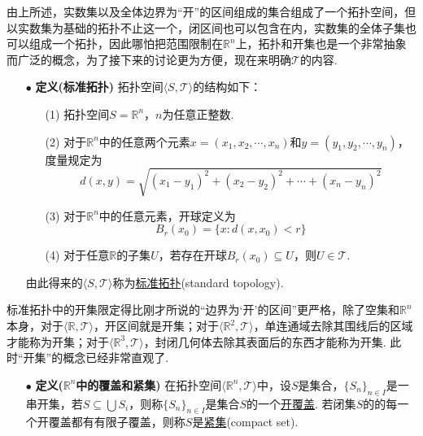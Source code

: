 \documentclass[main.tex]{subfiles}
\begin{document}
由上所述，实数集以及全体边界为“开”的区间组成的集合组成了一个拓扑空间，但以实数集为基础的拓扑不止这一个，闭区间也可以包含在内，实数集的全体子集也可以组成一个拓扑，因此哪怕把范围限制在\(\mathbb{R}^n\)上，拓扑和开集也是一个非常抽象而广泛的概念，为了接下来的讨论更为方便，现在来明确\(\mathcal{T}\)的内容.

\begin{itemize}
    \item [\(\bullet\)] \textbf{定义(标准拓扑)}
    \newline
    拓扑空间\(\langle S, \mathcal{T} \rangle\)的结构如下：
    \begin{itemize}
        \item[(1)] 拓扑空间\(S=\mathbb{R}^n\)，\(n\)为任意正整数.
        \item[(2)] 对于\(\mathbb{R}^n\)中的任意两个元素\(x=(x_1, x_2, \cdots, x_n)\)和\(y=(y_1,y_2,\cdots,y_n)\)，度量规定为
        \[d(x,y)=\sqrt{(x_1-y_1)^2+(x_2-y_2)^2+\cdots+(x_n-y_n)^2}\]
        \item[(3)] 对于\(\mathbb{R}^n\)中的任意元素，开球定义为
        \[B_r(x_0) = \{x: d(x,x_0) < r\}\]
        \item[(4)] 对于任意\(\mathbb{R}\)的子集\(U\)，若存在开球\(B_r(x_0) \subseteq U\)，则\(U \in \mathcal{T}\).
    \end{itemize}
    由此得来的\(\langle S, \mathcal{T} \rangle\)称为\uline{标准拓扑}(standard topology).
\end{itemize}

标准拓扑中的开集限定得比刚才所说的“边界为‘开’的区间”更严格，除了空集和\(\mathbb{R}^n\)本身，对于\(\langle \mathbb{R}, \mathcal{T} \rangle\)，开区间就是开集；对于\(\langle \mathbb{R}^2, \mathcal{T} \rangle\)，单连通域去除其围线后的区域才能称为开集；对于\(\langle \mathbb{R}^3, \mathcal{T} \rangle\)，封闭几何体去除其表面后的东西才能称为开集. 此时“开集”的概念已经非常直观了.

\begin{itemize}
    \item [\(\bullet\)] \textbf{定义(\(\mathbb{R}^n\)中的覆盖和紧集)}
    \newline
    在拓扑空间\(\langle \mathbb{R}^n,\mathcal{T} \rangle \)中，设\(S\)是集合，\(\{S_n\}_{n \in I}\)是一串开集，若\(S \subseteq \bigcup S_i\)，则称\(\{S_n\}_{n \in I}\)是集合\(S\)的一个\uline{开覆盖}.
    \newline
    若闭集\(S\)的的每一个开覆盖都有有限子覆盖，则称\(S\)是\uline{紧集}(compact set).
\end{itemize}
\end{document}
